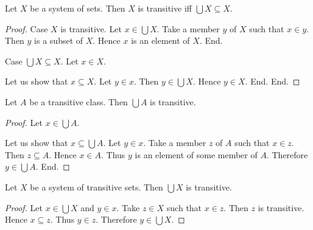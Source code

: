 \documentclass[../../set-theory/set-theory.tex]{subfiles}
\begin{document}
  \begin{forthel}
    \begin{proposition}
      Let $X$ be a system of sets.
      Then $X$ is transitive iff $\bigcup X \subseteq X$.
    \end{proposition}
    \begin{proof}
      Case $X$ is transitive.
        Let $x \in \bigcup X$.
        Take a member $y$ of $X$ such that $x \in y$.
        Then $y$ is a subset of $X$.
        Hence $x$ is an element of $X$.
      End.

      Case $\bigcup X \subseteq X$.
        Let $x \in X$.

        Let us show that $x \subseteq X$.
          Let $y \in x$.
          Then $y \in \bigcup X$.
          Hence $y \in X$.
        End.
      End.
    \end{proof}
  \end{forthel}

  \begin{forthel}
    \begin{proposition}
      Let $A$ be a transitive class.
      Then $\bigcup A$ is transitive.
    \end{proposition}
    \begin{proof}
      Let $x \in \bigcup A$.

      Let us show that $x \subseteq \bigcup A$.
        Let $y \in x$.
        Take a member $z$ of $A$ such that $x \in z$.
        Then $z \subseteq A$.
        Hence $x \in A$.
        Thus $y$ is an element of some member of $A$.
        Therefore $y \in \bigcup A$.
      End.
    \end{proof}
  \end{forthel}

  \begin{forthel}
    \begin{proposition}
      Let $X$ be a system of transitive sets.
      Then $\bigcup X$ is transitive.
    \end{proposition}
    \begin{proof}
      Let $x \in \bigcup X$ and $y \in x$.
      Take $z \in X$ such that $x \in z$.
      Then $z$ is transitive.
      Hence $x \subseteq z$.
      Thus $y \in z$.
      Therefore $y \in \bigcup X$.
    \end{proof}
  \end{forthel}
\end{document}
